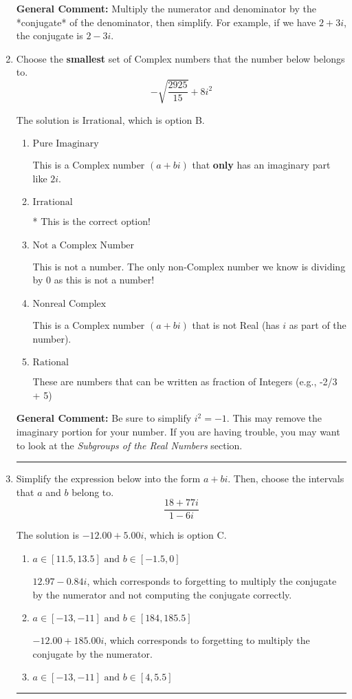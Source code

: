 \documentclass{extbook}[14pt]
\newcommand{\litem}[1]{\item #1

\rule{\textwidth}{0.4pt}}
\begin{document}
\begin{enumerate}
{\textbf{General Comment:} Multiply the numerator and denominator by the *conjugate* of the denominator, then simplify. For example, if we have $2+3i$, the conjugate is $2-3i$.
}
\litem{
Choose the \textbf{smallest} set of Complex numbers that the number below belongs to.
\[ -\sqrt{\frac{2925}{15}}+8i^2 \]

The solution is \( \text{Irrational} \), which is option B.\begin{enumerate}[label=\Alph*.]
\item \( \text{Pure Imaginary} \)

This is a Complex number $(a+bi)$ that \textbf{only} has an imaginary part like $2i$.
\item \( \text{Irrational} \)

* This is the correct option!
\item \( \text{Not a Complex Number} \)

This is not a number. The only non-Complex number we know is dividing by 0 as this is not a number!
\item \( \text{Nonreal Complex} \)

This is a Complex number $(a+bi)$ that is not Real (has $i$ as part of the number).
\item \( \text{Rational} \)

These are numbers that can be written as fraction of Integers (e.g., -2/3 + 5)
\end{enumerate}

\textbf{General Comment:} Be sure to simplify $i^2 = -1$. This may remove the imaginary portion for your number. If you are having trouble, you may want to look at the \textit{Subgroups of the Real Numbers} section.
}
\litem{
Simplify the expression below into the form $a+bi$. Then, choose the intervals that $a$ and $b$ belong to.
\[ \frac{18 + 77 i}{1 - 6 i} \]

The solution is \( -12.00  + 5.00 i \), which is option C.\begin{enumerate}[label=\Alph*.]
\item \( a \in [11.5, 13.5] \text{ and } b \in [-1.5, 0] \)

 $12.97  - 0.84 i$, which corresponds to forgetting to multiply the conjugate by the numerator and not computing the conjugate correctly.
\item \( a \in [-13, -11] \text{ and } b \in [184, 185.5] \)

 $-12.00  + 185.00 i$, which corresponds to forgetting to multiply the conjugate by the numerator.
\item \( a \in [-13, -11] \text{ and } b \in [4, 5.5] \)


\end{enumerate}}
\end{enumerate}
\end{document}
